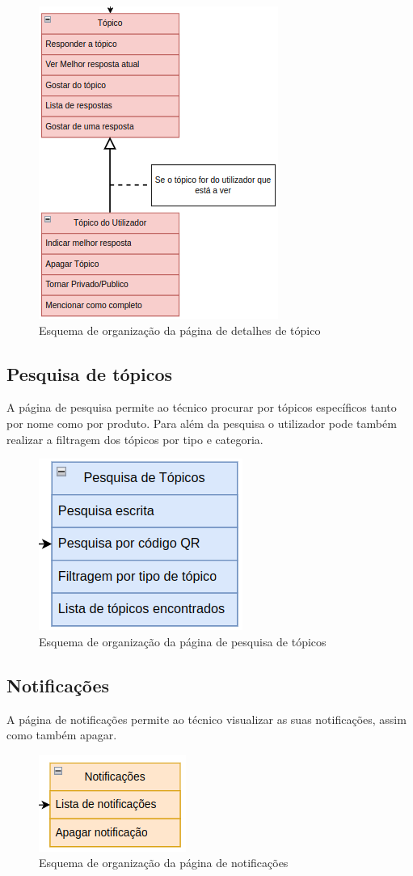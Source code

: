 \begin{figure}[htb]
  \centering
  
  \includegraphics[height=0.55\textwidth]{images/Arquiteturas/superficial_de_app/detalhes_topico.png}
  \caption{Esquema de organização da página de detalhes de tópico}
  \label{fig:7}
\end{figure}

\subsection{Pesquisa de tópicos}

A página de pesquisa permite ao técnico procurar por tópicos específicos tanto por nome como por produto. Para além da pesquisa o utilizador pode também realizar a filtragem dos 
tópicos por tipo e categoria.
\begin{figure}[htb]
  \centering
  
  \includegraphics[height=0.3\textwidth]{images/Arquiteturas/superficial_de_app/pesquisa_forum.png}
  \caption{Esquema de organização da página de pesquisa de tópicos}
  \label{fig:8}
\end{figure}

\subsection{Notificações}

A página de notificações permite ao técnico visualizar as suas notificações, assim como também apagar.
\begin{figure}[htb]
  \centering
  
  \includegraphics[height=0.2\textwidth]{images/Arquiteturas/superficial_de_app/notificacoes.png}
  \caption{Esquema de organização da página de notificações}
  \label{fig:9}
\end{figure}

